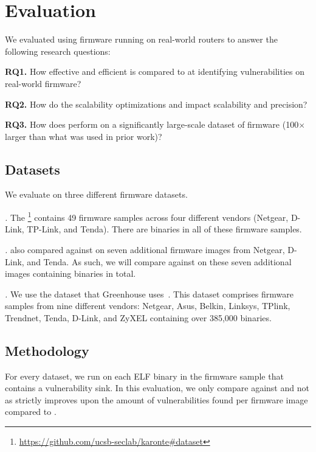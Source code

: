 
\section{Evaluation}
\label{sec:evaluation}

We evaluated \mango using firmware running on real-world routers to answer the following research questions:
\smallskip

\noindent
\textbf{RQ1.}
How effective and efficient is \mango compared to \satc at identifying vulnerabilities on real-world firmware?

\noindent
\textbf{RQ2.}
How do the scalability optimizations \rev and \assumed impact scalability and precision?

\noindent
\textbf{RQ3.}
How does \mango perform on a significantly large-scale dataset of firmware (100$\times$ larger than what was used in prior work)?

\subsection{Datasets}
We evaluate \mango on three different firmware datasets.

\smallskip
\noindent
\emph{\karonteDataset.}
The \karonteDataset\footnote{\url{https://github.com/ucsb-seclab/karonte\#dataset}} contains 49 firmware samples across four different vendors (Netgear, D-Link, TP-Link, and Tenda).
There are \mangoCompTotalAnalyzedBins binaries in all of these firmware samples.

\smallskip
\noindent
\emph{\satcHandPickDataset.}
\satc also compared against \karonte on seven additional firmware images from Netgear, D-Link, and Tenda.
As such, we will compare against \satc on these seven additional images containing \satcManTotalBinAmount binaries in total.

\smallskip
\noindent
\emph{\largeScaleDataset.}
We use the dataset that Greenhouse uses~\cite{greenhouse}.
This dataset comprises \ldsize firmware samples from nine different vendors: Netgear, Asus, Belkin, Linksys, TPlink, Trendnet, Tenda, D-Link, and ZyXEL containing over 385,000 binaries.

\subsection{Methodology}
\label{sec:eval-methodology}

For every dataset, we run \mango on each ELF binary in the firmware sample that contains a vulnerability sink.
In this evaluation, we only compare against \satc and not \karonte as \satc strictly improves upon the amount of vulnerabilities found per firmware image compared to \karonte.

